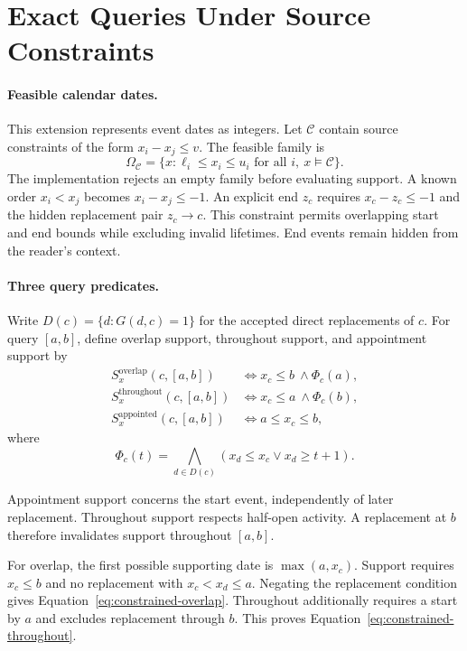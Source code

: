 \section{Exact Queries Under Source Constraints}
\label{app:constrained-dates}

\paragraph{Feasible calendar dates.}
This extension represents event dates as integers.
Let $\mathcal C$ contain source constraints of the form $x_i-x_j\le v$.
The feasible family is
\[
 \Omega_{\mathcal C}
 =\{x:\ell_i\le x_i\le u_i\text{ for all }i,\ x\models\mathcal C\}.
\]
The implementation rejects an empty family before evaluating support.
A known order $x_i<x_j$ becomes $x_i-x_j\le-1$.
An explicit end $z_c$ requires $x_c-z_c\le-1$ and the hidden replacement pair $z_c\to c$.
This constraint permits overlapping start and end bounds while excluding invalid lifetimes.
End events remain hidden from the reader's context.

\paragraph{Three query predicates.}
Write $D(c)=\{d:G(d,c)=1\}$ for the accepted direct replacements of $c$.
For query $[a,b]$, define overlap support, throughout support, and appointment support by
\begin{align}
 S^{\mathrm{overlap}}_x(c,[a,b])
 &\iff x_c\le b\ \land \Phi_c(a),\label{eq:constrained-overlap}\\
 S^{\mathrm{throughout}}_x(c,[a,b])
 &\iff x_c\le a\ \land \Phi_c(b),\label{eq:constrained-throughout}\\
 S^{\mathrm{appointed}}_x(c,[a,b])
 &\iff a\le x_c\le b,\label{eq:constrained-appointed}
\end{align}
where
\[
 \Phi_c(t)=\bigwedge_{d\in D(c)}(x_d\le x_c\lor x_d\ge t+1).
\]

Appointment support concerns the start event, independently of later replacement.
Throughout support respects half-open activity.
A replacement at $b$ therefore invalidates support throughout $[a,b]$.

For overlap, the first possible supporting date is $\max(a,x_c)$.
Support requires $x_c\le b$ and no replacement with $x_c<x_d\le a$.
Negating the replacement condition gives Equation~\eqref{eq:constrained-overlap}.
Throughout additionally requires a start by $a$ and excludes replacement through $b$.
This proves Equation~\eqref{eq:constrained-throughout}.


